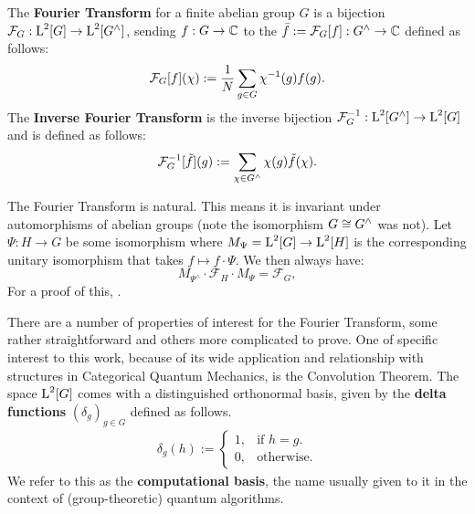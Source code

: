 \begin{definition}
The \textbf{Fourier Transform} for a finite abelian group $G$ is a bijection $\mathcal{F}_G:\operatorname{L}^2[G]\rightarrow\operatorname{L}^2[G^\wedge]$, sending $f:G\to\mathbb{C}$ to the $\bar{f}:=\mathcal{F}_G[f]:G^\wedge\to\mathbb{C}$ defined as follows:
\begin{equation}\label{eqn_DefTraditionalFT}
  \mathcal{F}_G[f](\chi) := \frac{1}{N}\sum_{g \in G}\chi^{-1}(g)f(g).
\end{equation}
The \textbf{Inverse Fourier Transform} is the inverse bijection $\mathcal{F}_G^{-1}: \operatorname{L}^2[G^\wedge] \rightarrow \operatorname{L}^2[G]$ and is defined as follows:
\begin{equation}\label{eqn_DefTraditionalInverseFT}
  \mathcal{F}_G^{-1}[\tilde{f}](g) := \sum_{\chi \in G^\wedge}\chi(g)\tilde{f}(\chi).
\end{equation}
\end{definition}

The Fourier Transform is natural.  This means it is invariant under automorphisms of abelian groups (note the isomorphism $G \cong G^\wedge$ was not). Let $\Psi : H \rightarrow G$ be some isomorphism where $M_\Psi = \operatorname{L}^2[G] \rightarrow \operatorname{L}^2[H]$ is the corresponding unitary isomorphism that takes $f\mapsto f\cdot \Psi$. We then always have:
\begin{equation}\label{eqn_FTcanonicity}
  M_{\Psi^\wedge} \cdot \mathcal{F}_H \cdot M_\Psi =  \mathcal{F}_G,
\end{equation}
For a proof of this, .

There are a number of properties of interest for the Fourier Transform, some rather straightforward and others more complicated to prove. One of specific interest to this work, because of its wide application and relationship with structures in Categorical Quantum Mechanics, is the Convolution Theorem. The space $\operatorname{L}^2[G]$ comes with a distinguished orthonormal basis, given by the \textbf{delta functions} $(\delta_g)_{g\in G}$ defined as follows.
\begin{align}\label{eqn_computationalBasis}
  \delta_g(h):=\begin{cases}
    1, & \text{if $h=g$}.\\
    0, & \text{otherwise}.
  \end{cases}
\end{align}
We refer to this as the \textbf{computational basis}, the name usually given to it in the context of (group-theoretic) quantum algorithms.

